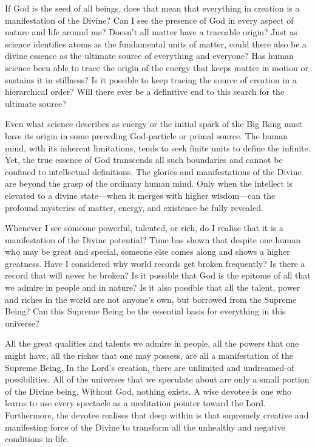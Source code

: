 \newpage
\begin{mananam}{}
\normalfont\mananamtext If God is the seed of all beings, does that mean that everything in creation is a manifestation of the Divine? Can I see the presence of God in every aspect of nature and life around me?
Doesn’t all matter have a traceable origin? Just as science identifies atoms as the fundamental units of matter, could there also be a divine essence as the ultimate source of everything and everyone?
Has human science been able to trace the origin of the energy that keeps matter in motion or sustains it in stillness? Is it possible to keep tracing the source of creation in a hierarchical order? Will there ever be a definitive end to this search for the ultimate source?
\end{mananam}
\sreflect
\begin{inspiration}{}
\normalfont\mananamtext Even what science describes as energy or the initial spark of the Big Bang must have its origin in some preceding God-particle or primal source. The human mind, with its inherent limitations, tends to seek finite units to define the infinite. Yet, the true essence of God transcends all such boundaries and cannot be confined to intellectual definitions.
The glories and manifestations of the Divine are beyond the grasp of the ordinary human mind. Only when the intellect is elevated to a divine state—when it merges with higher wisdom—can the profound mysteries of matter, energy, and existence be fully revealed.
\end{inspiration}
\newpage
\begin{mananam}{}
\normalfont\mananamtext Whenever I see someone powerful, talented, or rich, do I realise that it is a manifestation of the Divine potential? Time has shown that despite one human who may be great and special, someone else comes along and shows a higher greatness. Have I considered why world records get broken frequently? Is there a record that will never be broken? 
Is it possible that God is the epitome of all that we admire in people and in nature? Is it also possible that all the talent, power and riches in the world are not anyone’s own, but borrowed from the Supreme Being? Can this Supreme Being be the essential basis for everything in this universe?
\end{mananam}
\sreflect
\begin{inspiration}{}
\normalfont\mananamtext All the great qualities and talents we admire in people, all the powers that one might have, all the riches that one may possess, are all a manifestation of the Supreme Being. In the Lord’s creation, there are unlimited and undreamed-of possibilities. All of the universes that we speculate about are only a small portion of the Divine being. Without God, nothing exists. A wise devotee is one who learns to use every spectacle as a meditation pointer toward the Lord. Furthermore, the devotee realises that deep within is that supremely creative and manifesting force of the Divine to transform all the unhealthy and negative conditions in life. 
\end{inspiration}

